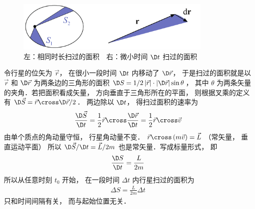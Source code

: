 
\begin{figure}[h]
\centering
\includegraphics[width=9.5cm]{./figures/Keple21.pdf}
\caption{左：相同时长扫过的面积\ \ 右：微小时间 $\D t$ 扫过的面积} \label{Keple21}
\end{figure}

令行星的位矢为 $\vec r$，  在很小一段时间 $\D t$ 内移动了 $\D \vec r$，  于是扫过的面积就是以 $\vec r$ 和 $\D \vec r$ 为两条边的三角形的面积 $\D S = {1}/{2}\left| {\vec r} \right| \cdot \left| {\D \vec r} \right|\sin \theta $，  其中 $\theta $ 为两条矢量的夹角．若把面积看成矢量， 方向垂直于三角形所在的平面， 则根据叉乘的定义有 $\D \vec S = \vec r \cross \D \vec r/2$． 两边除以 $\D t$，  得扫过面积的速率为
\begin{equation}
  \frac{{\D\vec S}}{{\D t}} = \frac{1}{2}\vec r \cross \frac{{\D\vec r}}{{\D t}} = \frac 12 \vec r\cross \vec v
\end{equation}
由单个质点的角动量守恒， 行星角动量不变．
$\vec r \cross \left( {m\vec v} \right) = \vec L$ （常矢量， 垂直运动平面） 所以 ${{\D\vec S}}/{{\D t}} = {{\vec L}}/{{2m}}$ 也是常矢量．写成标量形式， 即
\begin{equation}
  \frac{{\D S}}{{\D t}} = \frac{L}{{2m}}
\end{equation}
所以从任意时刻 ${t_0}$ 开始， 在一段时间 $\Delta t$ 内行星扫过的面积为 
\begin{equation}
  \begin{aligned}
  \Delta S = \frac{L}{{2m}}\Delta t
  \end{aligned}
\end{equation}
只和时间间隔有关， 而与起始位置无关．

